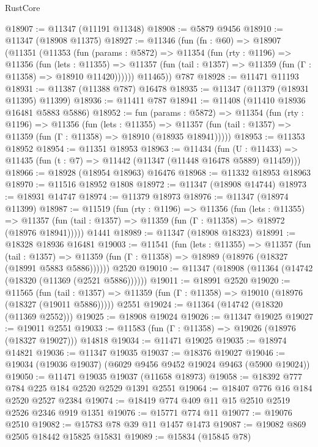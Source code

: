 \begin{lexlean}{RustCore}
\begin{coremodule}
@18907 := @11347 (@11191 @11348)
@18908 := @5879 @9456
@18910 := @11347 (@18908 @11375)
@18927 := @11346
    (fun (fn : @60) =>
    @18907
      (@11351
        (@11353
          (fun (params : @5872) =>
          @11354
            (fun (rty : @1196) =>
            @11356
              (fun (lets : @11355) =>
              @11357 (fun (tail : @1357) => @11359 (fun (Γ : @11358) => @18910 @11420))))))
        @11465))
    @787
@18928 := @11471 @11193
@18931 := @11387 (@11388 @787) @16478
@18935 := @11347 (@11379 (@18931 @11395) @11399)
@18936 := @11411 @787
@18941 := @11408 (@11410 @18936 @16481 @5883 @5886)
@18952 := fun (params : @5872) =>
  @11354
    (fun (rty : @1196) =>
    @11356
      (fun (lets : @11355) =>
      @11357 (fun (tail : @1357) => @11359 (fun (Γ : @11358) => @18910 (@18935 @18941)))))
@18953 := @11353 @18952
@18954 := @11351 @18953
@18963 := @11434
    (fun (U : @11433) => @11435 (fun (t : @7) => @11442 (@11347 (@11448 @16478 @5889) @11459)))
@18966 := @18928 (@18954 @18963) @16476
@18968 := @11332 @18953 @18963
@18970 := @11516 @18952 @1808
@18972 := @11347 (@18908 @14744)
@18973 := @18931 @14747
@18974 := @11379 @18973
@18976 := @11347 (@18974 @11399)
@18987 := @11519
    (fun (rty : @1196) =>
    @11356
      (fun (lets : @11355) =>
      @11357 (fun (tail : @1357) => @11359 (fun (Γ : @11358) => @18972 (@18976 @18941)))))
    @1441
@18989 := @11347 (@18908 @18323)
@18991 := @18328 @18936 @16481
@19003 := @11541
    (fun (lets : @11355) =>
    @11357
      (fun (tail : @1357) =>
      @11359 (fun (Γ : @11358) => @18989 (@18976 (@18327 (@18991 @5883 @5886))))))
    @2520
@19010 := @11347 (@18908 (@11364 (@14742 (@18320 (@11369 (@2521 @5886))))))
@19011 := @18991 @2520
@19020 := @11565
    (fun (tail : @1357) => @11359 (fun (Γ : @11358) => @19010 (@18976 (@18327 (@19011 @5886)))))
    @2551
@19024 := @11364 (@14742 (@18320 (@11369 @2552)))
@19025 := @18908 @19024
@19026 := @11347 @19025
@19027 := @19011 @2551
@19033 := @11583 (fun (Γ : @11358) => @19026 (@18976 (@18327 @19027))) @14818
@19034 := @11471 @19025
@19035 := @18974 @14821
@19036 := @11347 @19035
@19037 := @18376 @19027
@19046 := @19034 (@19036 @19037) (@6029 @9456 @9452 @19024 @9463 (@5900 @19024))
@19050 := @11471 @19035 @19037 (@11658 @18973)
@19058 := @18392 @777 @784 @225 @184 @2520 @2529 @1391 @2551
@19064 := @18407 @776 @16 @184 @2520 @2527 @2384
@19074 := @18419 @774 @409 @11 @15 @2510 @2519 @2526 @2346 @919 @1351
@19076 := @15771 @774 @11
@19077 := @19076 @2510
@19082 := @15783 @78 @39 @11 @1457 @1473
@19087 := @19082 @869 @2505 @18442 @15825 @15831
@19089 := @15834 (@15845 @78)

\end{coremodule}
\end{lexlean}
